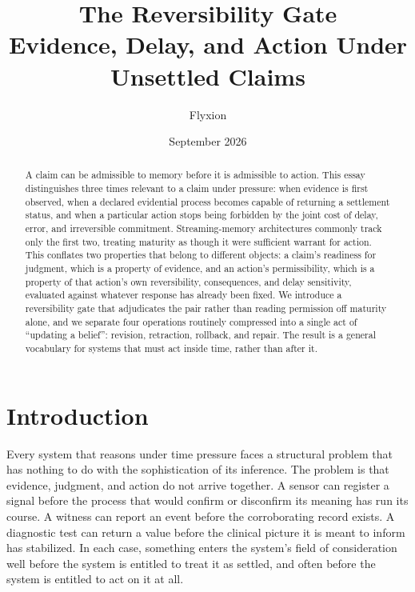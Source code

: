 \documentclass[11pt]{article}
\title{The Reversibility Gate\\[4pt]\large Evidence, Delay, and Action Under Unsettled Claims}
\author{Flyxion}
\date{September 2026}
\begin{document}
\maketitle

\begin{abstract}
A claim can be admissible to memory before it is admissible to action. This essay distinguishes three times relevant to a claim under pressure: when evidence is first observed, when a declared evidential process becomes capable of returning a settlement status, and when a particular action stops being forbidden by the joint cost of delay, error, and irreversible commitment. Streaming-memory architectures commonly track only the first two, treating maturity as though it were sufficient warrant for action. This conflates two properties that belong to different objects: a claim's readiness for judgment, which is a property of evidence, and an action's permissibility, which is a property of that action's own reversibility, consequences, and delay sensitivity, evaluated against whatever response has already been fixed. We introduce a reversibility gate that adjudicates the pair rather than reading permission off maturity alone, and we separate four operations routinely compressed into a single act of ``updating a belief'': revision, retraction, rollback, and repair. The result is a general vocabulary for systems that must act inside time, rather than after it.
\end{abstract}

\section{Introduction}

Every system that reasons under time pressure faces a structural problem that has nothing to do with the sophistication of its inference. The problem is that evidence, judgment, and action do not arrive together. A sensor can register a signal before the process that would confirm or disconfirm its meaning has run its course. A witness can report an event before the corroborating record exists. A diagnostic test can return a value before the clinical picture it is meant to inform has stabilized. In each case, something enters the system's field of consideration well before the system is entitled to treat it as settled, and often before the system is entitled to act on it at all.
\end{document}
